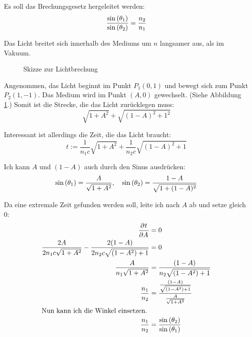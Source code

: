 \documentclass[11pt, ngerman]{article}
\begin{document}
Es soll das Brechungsgesetz hergeleitet werden:
\[ \frac{\sin\del{\theta_1}}{\sin\del{\theta_2}} = \frac{n_2}{n_1} \]

Das Licht breitet sich innerhalb des Mediums um $n$ langsamer aus, als im Vakuum.

\begin{figure}[h]
	\centering
	\caption{Skizze zur Lichtbrechung}
	\label{fig:Brechung}
\end{figure}

Angenommen, das Licht beginnt im Punkt $P_1(0, 1)$ und bewegt sich zum Punkt
$P_2(1, -1)$. Das Medium wird im Punkt $(A, 0)$ gewechselt. (Siehe Abbildung
\ref{fig:Brechung}.) Somit ist die Strecke, die das Licht zurücklegen muss:
\[ \sqrt{1 + A^2} + \sqrt{(1-A)^2 + 1^2} \]

Interessant ist allerdings die Zeit, die das Licht braucht:
\[ t := \frac 1{n_1 c} \sqrt{1 + A^2} + \frac 1{n_2 c} \sqrt{(1-A)^2 + 1} \]

Ich kann $A$ und $(1-A)$ auch durch den Sinus ausdrücken:
\[
	\sin\del{\theta_1} = \frac{A}{\sqrt{1 + A^2}}
	, \quad
	\sin\del{\theta_2} = \frac{1 - A}{\sqrt{1 + (1-A)^2}}
\]

Da eine extremale Zeit gefunden werden soll, leite ich nach $A$ ab und setze
gleich $0$:
%
\begin{align*}
\dpd t A &= 0 \\
\frac{2A}{2 n_1 c \sqrt{1+A^2}} - \frac{2(1-A)}{2 n_2 c \sqrt{(1-A^2)+1}} &= 0 \\
\frac{A}{n_1 \sqrt{1+A^2}} &= \frac{(1-A)}{n_2 \sqrt{(1-A^2)+1}} \\
\frac{n_1}{n_2} &= \frac{\frac{(1-A)}{\sqrt{(1-A^2)+1}}}{\frac{A}{\sqrt{1+A^2}}} \\
\intertext{Nun kann ich die Winkel einsetzen.}
\frac{n_1}{n_2} &= \frac{\sin\del{\theta_2}}{\sin\del{\theta_1}}
\end{align*}
\end{document}
